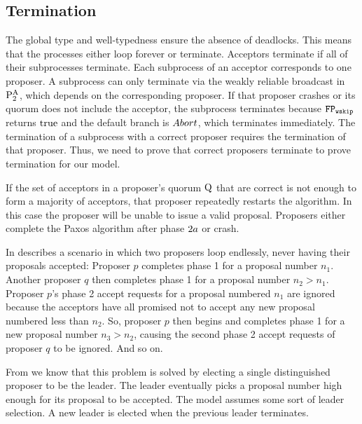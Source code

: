\subsection{Termination}
The global type and well-typedness ensure the absence of deadlocks.
This means that the processes either loop forever or terminate.
Acceptors terminate if all of their subprocesses terminate.
Each subprocess of an acceptor corresponds to one proposer.
A subprocess can only terminate via the weakly reliable broadcast in $\operatorname{P^{A}_{2}}$, which depends on the corresponding proposer.
If that proposer crashes or its quorum does not include the acceptor, the subprocess terminates because $\mathtt{FP_{wskip}}$ returns $\operatorname{true}$ and the default branch is $\mathnormal{Abort}$, which terminates immediately.
The termination of a subprocess with a correct proposer requires the termination of that proposer.
Thus, we need to prove that correct proposers terminate to prove termination for our model.

If the set of acceptors in a proposer's quorum $\operatorname{Q}$ that are correct is not enough to form a majority of acceptors, that proposer repeatedly restarts the algorithm.
In this case the proposer will be unable to issue a valid proposal.
Proposers either complete the Paxos algorithm after phase $2a$ or crash.

In \cite{Lamport01} \citeauthor{Lamport01} describes a scenario in which two proposers loop endlessly, never having their proposals accepted:
Proposer $p$ completes phase 1 for a proposal number $n_1$. Another proposer $q$ then completes phase 1 for a proposal number $n_2 > n_1$.
Proposer $p$'s phase 2 accept requests for a proposal numbered $n_1$ are ignored because the acceptors have all promised not to accept any new proposal numbered less than $n_2$.
So, proposer $p$ then begins and completes phase 1 for a new proposal number $n_3 > n_2$, causing the second phase 2 accept requests of proposer $q$ to be ignored.
And so on.

From \cite{Lamport01} we know that this problem is solved by electing a single distinguished proposer to be the leader.
The leader eventually picks a proposal number high enough for its proposal to be accepted.
The model assumes some sort of leader selection.
A new leader is elected when the previous leader terminates.

